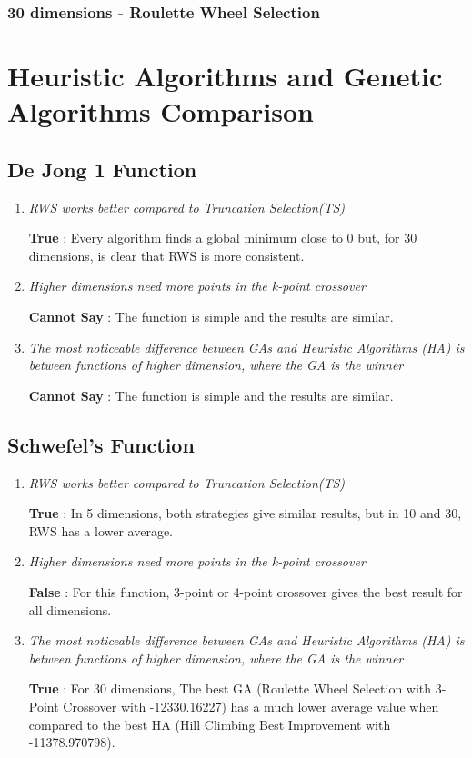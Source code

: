 \documentclass{article}
\begin{document}
\subsubsection{30 dimensions - Roulette Wheel Selection}

\newpage
\section{Heuristic Algorithms and Genetic Algorithms Comparison}
\subsection{De Jong 1 Function}
\begin{enumerate}
    \item \textit{RWS works better compared to Truncation Selection(TS)}
    
    \textbf{True} : Every algorithm finds a global minimum close to 0 but, for 30 dimensions, is clear that RWS is more consistent.
    
    \item \textit{Higher dimensions need more points in the k-point crossover}
    
    \textbf{Cannot Say} : The function is simple and the results are similar.

    \item \textit{The most noticeable difference between GAs and  Heuristic Algorithms (HA) is between functions of higher dimension, where the GA is the winner}
    
    \textbf{Cannot Say} : The function is simple and the results are similar.
    
\end{enumerate}

\subsection{Schwefel’s Function}
\begin{enumerate}
    \item \textit{RWS works better compared to Truncation Selection(TS)}
    
    \textbf{True} : In 5 dimensions, both strategies give similar results, but in 10 and 30, RWS has a lower average.
    
    \item \textit{Higher dimensions need more points in the k-point crossover}
    
    \textbf{False} : For this function, 3-point or 4-point crossover gives the best result for all dimensions.

    \item \textit{The most noticeable difference between GAs and  Heuristic Algorithms (HA) is between functions of higher dimension, where the GA is the winner}
    
    \textbf{True} : For 30 dimensions, The best GA (Roulette Wheel Selection with 3-Point Crossover with -12330.16227) has a much lower average value when compared to the best HA (Hill Climbing Best Improvement with -11378.970798).
    
\end{enumerate}
\end{document}
